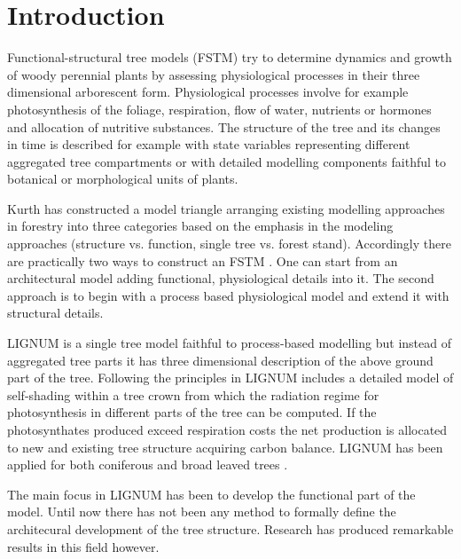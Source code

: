 \section{Introduction}
Functional-structural tree models (FSTM) try to determine dynamics and
growth of woody perennial  plants by assessing physiological processes
in their three  dimensional arborescent form.  Physiological processes
involve for  example photosynthesis of the  foliage, respiration, flow
of  water,   nutrients  or   hormones  and  allocation   of  nutritive
substances.   The structure of  the tree  and its  changes in  time is
described  for  example with  state  variables representing  different
aggregated  tree compartments  or with  detailed  modelling components
faithful to botanical or morphological units of plants.

Kurth  has  constructed a  model  triangle \citep{kurth:99}  arranging
existing modelling approaches in  forestry into three categories based
on the  emphasis in the modeling approaches  (structure vs.  function,
single tree vs.  forest stand).  Accordingly there are practically two
ways to construct an FSTM  \citep{sievanen:00}.  One can start from an
architectural  model   \citep{jaeger:92,kurth:94}  adding  functional,
physiological details into it.  The second approach is to begin with a
process  based  physiological  model  \citep{makela:86,  landsberg:86,
  sievanen:93} and extend it with structural details.

LIGNUM  is  a  single  tree  model  \citep{perttunen:96}  faithful  to
process-based  modelling \citep[see  e.g.][]{nikinmaa:92, sievanen:93,
  makela:97-1}  but instead  of  aggregated tree  parts  it has  three
dimensional  description  of  the  above  ground  part  of  the  tree.
Following the principles in \citet{hari:82} LIGNUM includes a detailed
model  of  self-shading   within  a  tree  crown  \citep{perttunen:96,
  perttunen:01} from which the  radiation regime for photosynthesis in
different parts  of the tree  can be computed.  If  the photosynthates
produced exceed  respiration costs the net production  is allocated to
new and existing tree  structure acquiring carbon balance.  LIGNUM has
been applied for  both coniferous \citep{perttunen:96,lo:99} and broad
leaved trees \citep{perttunen:01}.

The main  focus in LIGNUM has  been to develop the  functional part of
the model.  Until now there has not been any method to formally define
the  architecural development  of  the tree  structure.  Research  has
produced  remarkable  results  in  this  field  however.   

